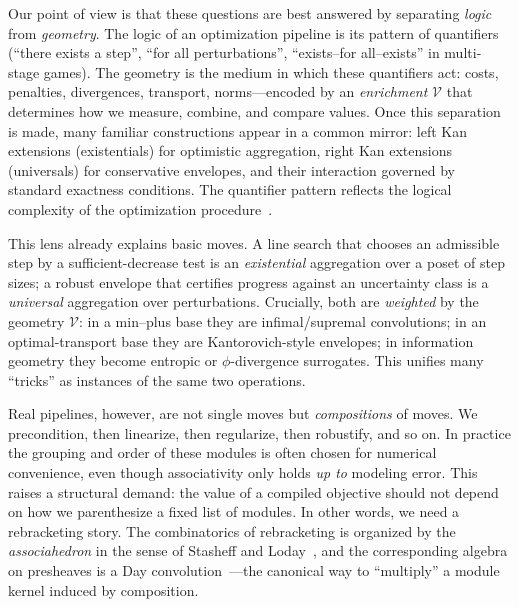 \documentclass[11pt]{article}
\numberwithin{equation}{section}
\theoremstyle{upright}
\newcommand{\V}{\mathcal{V}}
\begin{document}
Our point of view is that these questions are best answered by separating \emph{logic} from \emph{geometry}. The logic of an optimization pipeline is its pattern of quantifiers (``there exists a step'', ``for all perturbations'', ``exists--for all--exists'' in multi-stage games). The geometry is the medium in which these quantifiers act: costs, penalties, divergences, transport, norms—encoded by an \emph{enrichment} $\V$ that determines how we measure, combine, and compare values. Once this separation is made, many familiar constructions appear in a common mirror: left Kan extensions (existentials) for optimistic aggregation, right Kan extensions (universals) for conservative envelopes, and their interaction governed by standard exactness conditions. The quantifier pattern reflects the logical complexity of the optimization procedure~\cite{Lawvere1973,Kelly1982}.

This lens already explains basic moves. A line search that chooses an admissible step by a sufficient-decrease test is an \emph{existential} aggregation over a poset of step sizes; a robust envelope that certifies progress against an uncertainty class is a \emph{universal} aggregation over perturbations. Crucially, both are \emph{weighted} by the geometry $\V$: in a min--plus base they are infimal/supremal convolutions; in an optimal-transport base they are Kantorovich-style envelopes; in information geometry they become entropic or $\phi$-divergence surrogates. This unifies many ``tricks'' as instances of the same two operations.

Real pipelines, however, are not single moves but \emph{compositions} of moves. We precondition, then linearize, then regularize, then robustify, and so on. In practice the grouping and order of these modules is often chosen for numerical convenience, even though associativity only holds \emph{up to} modeling error. This raises a structural demand: the value of a compiled objective should not depend on how we parenthesize a fixed list of modules. In other words, we need a rebracketing story. The combinatorics of rebracketing is organized by the \emph{associahedron} in the sense of Stasheff and Loday~\citep{Stasheff1963I,Loday2004}, and the corresponding algebra on presheaves is a Day convolution~\citep{Day1970}—the canonical way to ``multiply'' a module kernel induced by composition. 
\end{document}
